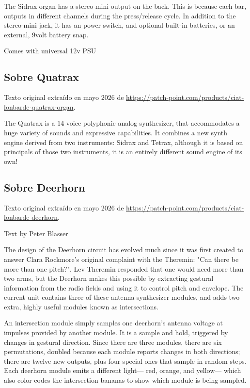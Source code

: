The Sidrax organ has a stereo-mini output on the back. This is because each bar, outputs in different channels during the press/release cycle. In addition to the stereo-mini jack, it has an power switch, and optional built-in batteries, or an external, 9volt battery snap.

Comes with universal 12v PSU

\newpage

\subsection{Sobre Quatrax}

Texto original extraído en mayo 2026 de \url{https://patch-point.com/products/ciat-lonbarde-quatrax-organ}.

The Quatrax is a 14 voice polyphonic analog synthesizer, that accommodates a huge variety of sounds and expressive capabilities. It combines a new synth engine derived from two instruments: Sidrax and Tetrax, although it is based on principals of those two instruments, it is an entirely different sound engine of its own! 

\newpage

\subsection{Sobre Deerhorn}

Texto original extraído en mayo 2026 de \url{https://patch-point.com/products/ciat-lonbarde-deerhorn}.

Text by Peter Blasser

The design of the Deerhorn circuit has evolved much since it was first created to answer Clara Rockmore's original complaint with the Theremin: "Can there be more than one pitch?". Lev Theremin responded that one would need more than two arms, but the Deerhorn makes this possible by extracting gestural information from the radio fields and using it to control pitch and envelope. The current unit contains three of these antenna-synthesizer modules, and adds two extra, highly useful modules known as intersections.

An intersection module simply samples one deerhorn's antenna voltage at impulses provided by another module. It is a sample and hold, triggered by changes in gestural direction. Since there are three modules, there are six permutations, doubled because each module reports changes in both directions; there are twelve new outputs, plus four special ones that sample in random steps. Each deerhorn module emits a different light— red, orange, and yellow— which also color-codes the intersection bananas to show which module is being sampled.

